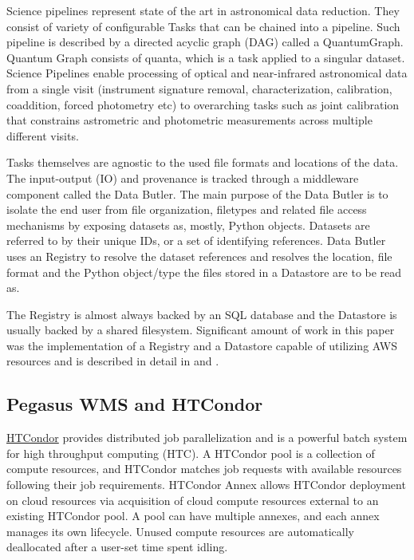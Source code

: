 \documentclass[a4paper, 10pt, conference]{ieeeconf}
\begin{document}
Science pipelines represent state of the art in astronomical data reduction. They consist of variety of configurable Tasks that can be chained into a pipeline. Such pipeline is described by a directed acyclic graph (DAG) called a QuantumGraph. Quantum Graph consists of quanta, which is a task applied to a singular dataset. Science Pipelines enable processing of optical and near-infrared astronomical data from a single visit (instrument signature removal, characterization, calibration, coaddition, forced photometry etc) to overarching tasks such as joint calibration that constrains astrometric and photometric measurements across multiple different visits. 

Tasks themselves are agnostic to the used file formats and locations of the data. The input-output (IO) and provenance is tracked through a middleware component called the Data Butler. The main purpose of the Data Butler is to isolate the end user from file organization, filetypes and related file access mechanisms by exposing datasets as, mostly, Python objects. Datasets are referred to by their unique IDs, or a set of identifying references. Data Butler uses an Registry to resolve the dataset references and resolves the location, file format and the Python object/type the files stored in a Datastore are to be read as.

The Registry is almost always backed by an SQL database and the Datastore is usually backed by a shared filesystem. Significant amount of work in this paper was the implementation of a Registry and a Datastore capable of utilizing AWS resources and is described in detail in \cite{dmtn114} and \cite{dmtn137}.

\subsection{Pegasus WMS and HTCondor}
\label{subsec:pegasuscondor}

\href{https://research.cs.wisc.edu/htcondor}{HTCondor} \cite{Thain:2005:HTCondor} provides distributed job parallelization and is a powerful batch system for high throughput computing (HTC). A HTCondor pool is a collection of compute resources, and HTCondor matches job requests with available resources following their job requirements. HTCondor Annex allows HTCondor deployment on cloud resources via acquisition of cloud compute resources external to an existing HTCondor pool. A pool can have multiple annexes, and each annex manages its own lifecycle. Unused compute resources are automatically deallocated after a user-set time spent idling. 
\end{document}
